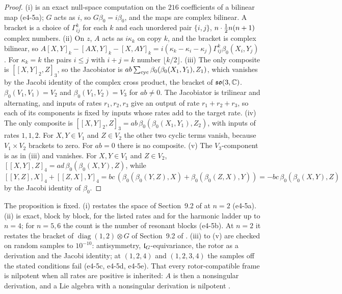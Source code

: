 \begin{proof}
(i) is an exact null-space computation on the $216$ coefficients of a bilinear map (e4-5a); $G$ acts as $i$, so $G\beta_0=i\beta_0$, and the maps are complex
bilinear. A bracket is a choice of $\Gamma^k_{ij}$ for each $k$ and each unordered pair $\{i,j\}$, $n\cdot\tfrac12 n(n+1)$ complex numbers. (ii) On $z$,
$A$ acts as $i\kappa_k$ on copy $k$, and the bracket is complex bilinear, so $A[X,Y]_k-[AX,Y]_k-[X,AY]_k=i(\kappa_k-\kappa_i-\kappa_j)\Gamma^k_{ij}\beta_0(X_i,Y_j)$. For
$\kappa_k=k$ the pairs $i\le j$ with $i+j=k$ number $\lfloor k/2\rfloor$. (iii) The only composite is $[[X,Y]_2,Z]_3$, so the Jacobiator is
$ab\sum_{\rm cyc}\beta_0(\beta_0(X_1,Y_1),Z_1)$, which vanishes by the Jacobi identity of the complex cross product, the bracket of $\mathfrak{so}(3,\mathbb{C})$.
$\beta_0(V_1,V_1)=V_2$ and $\beta_0(V_1,V_2)=V_3$ for $ab\neq0$. The Jacobiator is trilinear and alternating, and inputs of rates $r_1,r_2,r_3$ give an output of rate $r_1+r_2+r_3$, so each of its components is fixed
by inputs whose rates add to the target rate. (iv) The only composite is $[[X,Y]_2,Z]_3=ab\,\beta_0(\beta_0(X_1,Y_1),Z_2)$, with inputs of rates $1,1,2$. For $X,Y\in V_1$ and $Z\in V_2$
the other two cyclic terms vanish, because $V_1\times V_2$ brackets to zero. For $ab=0$ there is no composite. (v) The $V_3$-component is as in (iii)
and vanishes. For $X,Y\in V_1$ and $Z\in V_2$, $[[X,Y],Z]_4=ad\,\beta_0(\beta_0(X,Y),Z)$, while
$[[Y,Z],X]_4+[[Z,X],Y]_4=bc\,(\beta_0(\beta_0(Y,Z),X)+\beta_0(\beta_0(Z,X),Y))=-bc\,\beta_0(\beta_0(X,Y),Z)$ by the Jacobi identity of $\beta_0$.
\end{proof}

The proposition is fixed. (i) restates the space of Section~9.2 of \cite{RE} at $n=2$ (e4-5a). (ii) is exact, block by block, for the listed rates and
for the harmonic ladder up to $n=4$; for $n=5,6$ the count is the number of resonant blocks (e4-5b). At $n=2$ it restates the bracket of
$\operatorname{diag}(1,2)\otimes G$ of Section~9.2 of \cite{RE}. (iii) to (v) are checked on random samples to $10^{-10}$: antisymmetry,
$\mathfrak l_G$-equivariance, the rotor as a derivation and the Jacobi identity; at $(1,2,4)$ and $(1,2,3,4)$ the samples off the stated conditions fail (e4-5c,
e4-5d, e4-5e). That every rotor-compatible frame is nilpotent when all rates are positive is inherited: $A$ is then a nonsingular derivation, and a
Lie algebra with a nonsingular derivation is nilpotent \cite{Jacobson55}.

